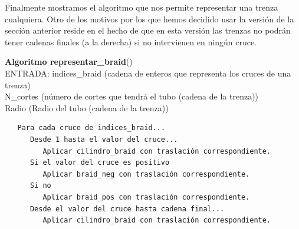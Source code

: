   Finalmente mostramos el algoritmo que nos permite representar una trenza cualquiera. Otro de los motivos por los que hemos decidido usar la versión de la sección anterior reside en el hecho de que en esta versión las trenzas no podrán tener cadenas finales (a la derecha) si no intervienen en ningún cruce. 
    \begin{alg}
    	\textbf{Algoritmo representar\_braid}()\\
    	ENTRADA: indices\_braid (cadena de enteros que representa los cruces de una trenza)\\
    	\hspace*{2.2cm} N\_cortes (número de cortes que tendrá el tubo (cadena de la trenza))\\
    	\hspace*{2.2cm} Radio (Radio del tubo (cadena de la trenza))
    	
\begin{lstlisting} 
   Para cada cruce de indices_braid...
      Desde 1 hasta el valor del cruce...
         Aplicar cilindro_braid con traslación correspondiente.
      Si el valor del cruce es positivo 
         Aplicar braid_neg con traslación correspondiente.
      Si no 
         Aplicar braid_pos con traslación correspondiente.
      Desde el valor del cruce hasta cadena final...
         Aplicar cilindro_braid con traslación correspondiente. 
\end{lstlisting}
    \end{alg}
    
